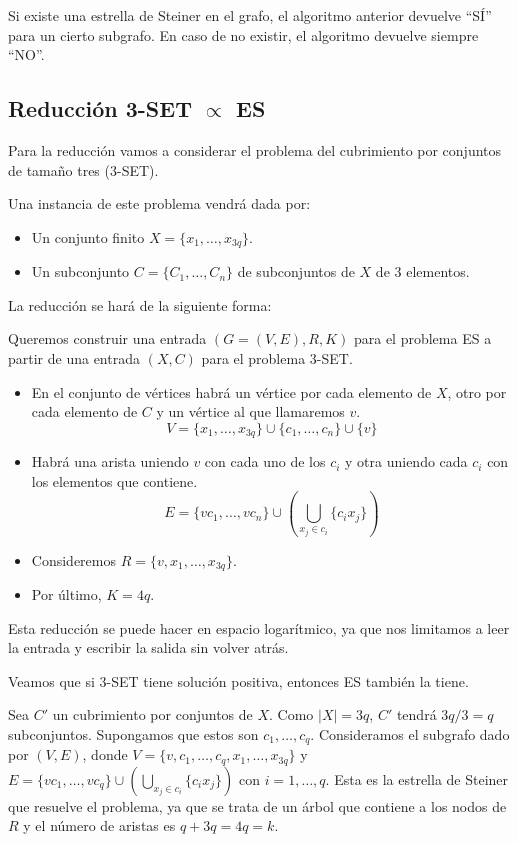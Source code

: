 \documentclass[a4paper, 11pt]{article}
\begin{document}
Si existe una estrella de Steiner en el grafo, el algoritmo anterior devuelve ``SÍ'' para un cierto subgrafo. En caso de no existir, el algoritmo devuelve siempre ``NO''.

\subsection*{Reducción 3-SET $\propto$ ES}
Para la reducción vamos a considerar el problema del cubrimiento por conjuntos de tamaño tres (3-SET).

Una instancia de este problema vendrá dada por:
\begin{itemize}
\item Un conjunto finito $X = \{x_1, \dots, x_{3q}\}$.
\item Un subconjunto $C = \{C_1,\dots,C_n\}$ de subconjuntos de $X$ de 3 elementos.
\end{itemize}

La reducción se hará de la siguiente forma:

Queremos construir una entrada $(G=(V,E),R,K)$ para el problema ES a partir de una entrada $(X,C)$ para el problema 3-SET.

\begin{itemize}
\item En el conjunto de vértices habrá un vértice por cada elemento de $X$, otro por cada elemento de $C$ y un vértice al que llamaremos $v$. $$V= \{x_1,\dots,x_{3q}\} \cup \{c_1,\dots, c_n\} \cup \{v\}$$
\item Habrá una arista uniendo $v$ con cada uno de los $c_i$ y otra uniendo cada $c_i$ con los elementos que contiene. $$E = \{vc_1, \dots, vc_n\} \cup (\bigcup_{x_j \in c_i}\{c_ix_j\})$$
\item Consideremos $R = \{v, x_1, \dots, x_{3q}\}$.
\item Por último, $K = 4q$.
\end{itemize}

Esta reducción se puede hacer en espacio logarítmico, ya que nos limitamos a leer la entrada y escribir la salida sin volver atrás.

Veamos que si 3-SET tiene solución positiva, entonces ES también la tiene.

Sea $C'$ un cubrimiento por conjuntos de $X$. Como $|X| = 3q$, $C'$ tendrá $3q/3 = q$ subconjuntos. Supongamos que estos son $c_1,\dots, c_q$. Consideramos el subgrafo dado por $(V,E)$, donde $V=\{v,c_1,\dots,c_q,x_1,\dots,x_{3q}\}$ y $E=\{vc_1,\dots,vc_q\}\cup(\bigcup_{x_j \in c_i}\{c_ix_j\})$ con $i=1,\dots,q$. Esta es la estrella de Steiner que resuelve el problema, ya que se trata de un árbol que contiene a los nodos de $R$ y el número de aristas es $q+3q = 4q = k$.
\end{document}
